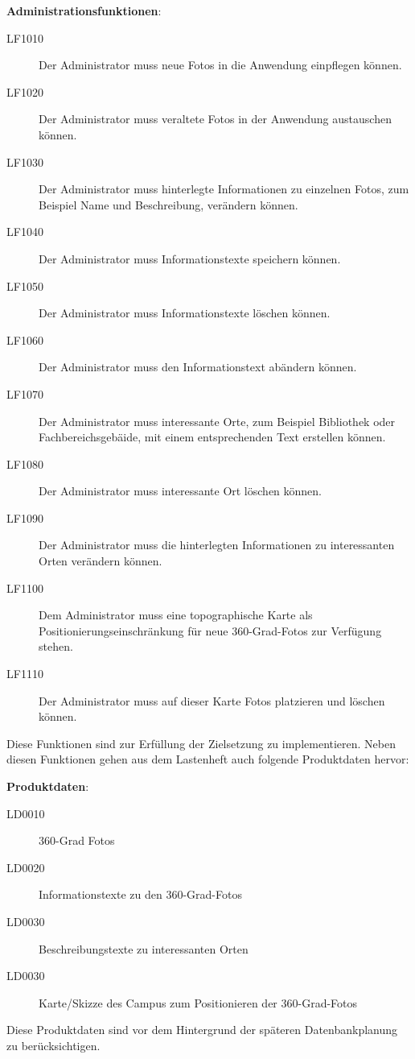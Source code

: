 \textbf{Administrationsfunktionen}:

\begin{description}
  \item[LF1010] Der Administrator muss neue Fotos in die Anwendung einpflegen können.
  \item[LF1020] Der Administrator muss veraltete Fotos in der Anwendung austauschen können.
  \item[LF1030] Der Administrator muss hinterlegte Informationen zu einzelnen Fotos, zum Beispiel Name und Beschreibung, verändern können.
  \item[LF1040] Der Administrator muss Informationstexte speichern können.
  \item[LF1050] Der Administrator muss Informationstexte löschen können.
  \item[LF1060] Der Administrator muss den Informationstext abändern können.
  \item[LF1070] Der Administrator muss interessante Orte, zum Beispiel Bibliothek oder Fachbereichsgebäide, mit einem entsprechenden Text erstellen können.
  \item[LF1080] Der Administrator muss interessante Ort löschen können.
  \item[LF1090] Der Administrator muss die hinterlegten Informationen zu interessanten Orten verändern können.
  \item[LF1100] Dem Administrator muss eine topographische Karte als Positionierungseinschränkung für neue
  360-Grad-Fotos zur Verfügung stehen.
  \item[LF1110] Der Administrator muss auf dieser Karte Fotos platzieren und löschen können.
\end{description}

Diese Funktionen sind zur Erfüllung der Zielsetzung zu implementieren. Neben diesen Funktionen gehen aus dem Lastenheft 
auch folgende Produktdaten hervor:

\textbf{Produktdaten}:

\begin{description}
  \item[LD0010] 360-Grad Fotos
  \item[LD0020] Informationstexte zu den 360-Grad-Fotos
  \item[LD0030] Beschreibungstexte zu interessanten Orten
  \item[LD0030] Karte/Skizze des Campus zum Positionieren der 360-Grad-Fotos
\end{description}

Diese Produktdaten sind vor dem Hintergrund der späteren Datenbankplanung zu berücksichtigen.